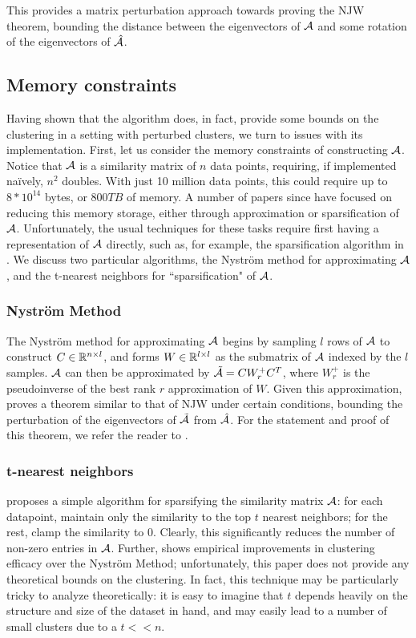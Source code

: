 This provides a matrix perturbation approach towards proving the NJW theorem,
bounding the distance between the eigenvectors of $\mathcal{A}$ and some rotation of
the eigenvectors of $\hat{\mathcal{A}}$.

\subsection{Memory constraints}
Having shown that the algorithm does, in fact, provide some bounds on the
clustering in a setting with perturbed clusters, we turn to issues with its
implementation. First, let us consider the memory constraints of constructing
$\mathcal{A}$. Notice that $\mathcal{A}$ is a similarity matrix of $n$ data points, requiring,
if implemented na\"{i}vely, $n^2$ doubles. With just 10 million data points,
this could require up to $8 * 10^14$ bytes, or $800 TB$ of memory. A number
of papers since have focused on reducing this memory storage, either through
approximation or sparsification of $\mathcal{A}$. Unfortunately, the usual techniques
for these tasks require first having a representation of $\mathcal{A}$ directly, such as,
for example, the sparsification algorithm in \cite{spielman2011graph}. We
discuss two particular algorithms, the Nystr\"{o}m method for approximating
$\mathcal{A}$, and the t-nearest neighbors for ``sparsification" of $\mathcal{A}$.

\subsubsection{Nystr\"{o}m Method}
The Nystr\"{o}m method for approximating $\mathcal{A}$ begins by sampling $l$ rows
of $\mathcal{A}$ to construct $C \in \mathbb{R}^{n \times l}$, and forms $W \in \mathbb{R}^{l \times l}$
as the submatrix of $\mathcal{A}$ indexed by the $l$ samples. $\mathcal{A}$ can then be
approximated by $\tilde{\mathcal{A}} = C W_r^+ C^T$, where $W_r^+$ is the pseudoinverse
of the best rank $r$ approximation of $W$. Given this approximation,
\cite{choromanska2013fast} proves a theorem similar to that of NJW under
certain conditions, bounding the perturbation of the eigenvectors of
$\tilde{\mathcal{A}}$ from $\hat{\mathcal{A}}$. For the statement and proof of this theorem, we
refer the reader to \cite{choromanska2013fast}.

\subsubsection{t-nearest neighbors}
 proposes a simple algorithm for sparsifying the similarity matrix
$\mathcal{A}$: for each datapoint, maintain only the similarity to the top $t$ nearest
neighbors; for the rest, clamp the similarity to $0$. Clearly, this significantly
reduces the number of non-zero entries in $\mathcal{A}$. Further,  shows
empirical improvements in clustering efficacy over the Nystr\"{o}m Method;
unfortunately, this paper does not provide any theoretical bounds on the
clustering. In fact, this technique may be particularly tricky to analyze
theoretically: it is easy to imagine that $t$ depends heavily on the structure
and size of the dataset in hand, and may easily lead to a number of small
clusters due to a $t << n$.

